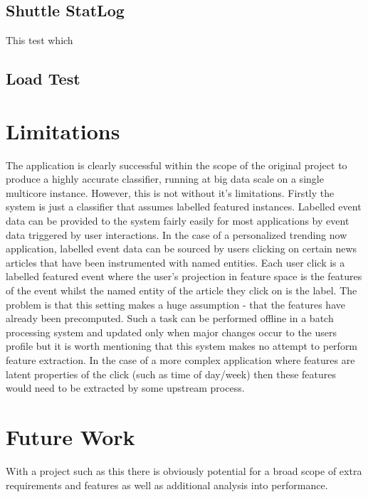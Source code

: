 \documentclass[a4paper,11pt]{scrreprt}
\begin{document}
\subsection{Shuttle StatLog}
This test which 
\subsection{Load Test}
\section{Limitations}
The application is clearly successful within the scope of the original project to produce a highly accurate classifier, running at big data scale on a single multicore instance. However, this is not without it's limitations. Firstly the system is just a classifier that assumes labelled featured instances. Labelled event data can be provided to the system fairly easily for most applications by event data triggered by user interactions. In the case of a personalized trending now application, labelled event data can be sourced by users clicking on certain news articles that have been instrumented with named entities. Each user click is a labelled featured event where the user's projection in feature space is the features of the event whilst the named entity of the article they click on is the label. The problem is that this setting makes a huge assumption - that the features have already been precomputed. Such a task can be performed offline in a batch processing system and updated only when major changes occur to the users profile but it is worth mentioning that this system makes no attempt to perform feature extraction. In the case of a more complex application where features are latent properties of the click (such as time of day/week) then these features would need to be extracted by some upstream process. 
\section{Future Work}
With a project such as this there is obviously potential for a broad scope of extra requirements and features as well as additional analysis into performance. 
\end{document}
